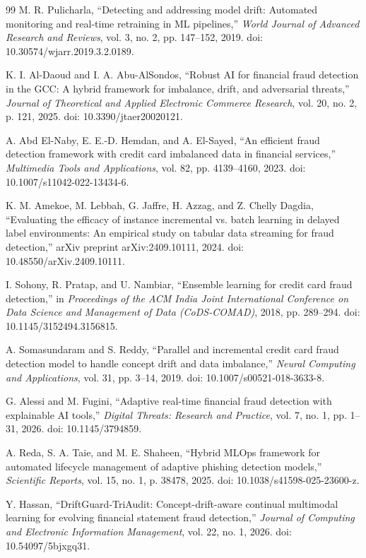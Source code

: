 \begin{thebibliography}{99}
M. R. Pulicharla, ``Detecting and addressing model drift: Automated monitoring and real-time retraining in ML pipelines,'' \textit{World Journal of Advanced Research and Reviews}, vol. 3, no. 2, pp. 147--152, 2019. doi: 10.30574/wjarr.2019.3.2.0189.

K. I. Al-Daoud and I. A. Abu-AlSondos, ``Robust AI for financial fraud detection in the GCC: A hybrid framework for imbalance, drift, and adversarial threats,'' \textit{Journal of Theoretical and Applied Electronic Commerce Research}, vol. 20, no. 2, p. 121, 2025. doi: 10.3390/jtaer20020121.

A. Abd El-Naby, E. E.-D. Hemdan, and A. El-Sayed, ``An efficient fraud detection framework with credit card imbalanced data in financial services,'' \textit{Multimedia Tools and Applications}, vol. 82, pp. 4139--4160, 2023. doi: 10.1007/s11042-022-13434-6.

K. M. Amekoe, M. Lebbah, G. Jaffre, H. Azzag, and Z. Chelly Dagdia, ``Evaluating the efficacy of instance incremental vs. batch learning in delayed label environments: An empirical study on tabular data streaming for fraud detection,'' arXiv preprint arXiv:2409.10111, 2024. doi: 10.48550/arXiv.2409.10111.

I. Sohony, R. Pratap, and U. Nambiar, ``Ensemble learning for credit card fraud detection,'' in \textit{Proceedings of the ACM India Joint International Conference on Data Science and Management of Data (CoDS-COMAD)}, 2018, pp. 289--294. doi: 10.1145/3152494.3156815.

A. Somasundaram and S. Reddy, ``Parallel and incremental credit card fraud detection model to handle concept drift and data imbalance,'' \textit{Neural Computing and Applications}, vol. 31, pp. 3--14, 2019. doi: 10.1007/s00521-018-3633-8.

G. Alessi and M. Fugini, ``Adaptive real-time financial fraud detection with explainable AI tools,'' \textit{Digital Threats: Research and Practice}, vol. 7, no. 1, pp. 1--31, 2026. doi: 10.1145/3794859.

A. Reda, S. A. Taie, and M. E. Shaheen, ``Hybrid MLOps framework for automated lifecycle management of adaptive phishing detection models,'' \textit{Scientific Reports}, vol. 15, no. 1, p. 38478, 2025. doi: 10.1038/s41598-025-23600-z.

Y. Hassan, ``DriftGuard-TriAudit: Concept-drift-aware continual multimodal learning for evolving financial statement fraud detection,'' \textit{Journal of Computing and Electronic Information Management}, vol. 22, no. 1, 2026. doi: 10.54097/5bjxgq31.


\end{thebibliography}
